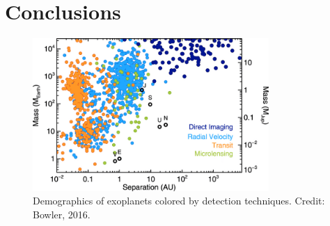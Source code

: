 \documentclass[11pt]{article}
\begin{document}

\section{Conclusions}

\begin{figure}[h!]
    \centering
    \includegraphics[width=0.8\textwidth]{Images/Exoplanet Demographic Techniques.png}
    \caption{Demographics of exoplanets colored by detection techniques. Credit: Bowler, 2016.}
    \label{fig:techniques}
\end{figure}
\end{document}
